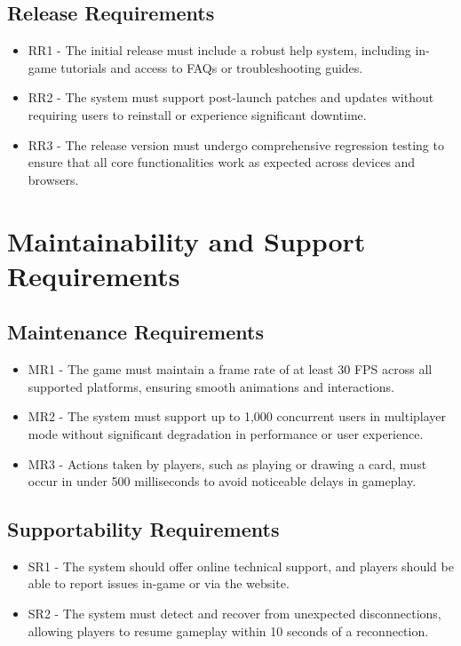 \documentclass{article}
\begin{document}
\subsection{Release Requirements}
\begin{itemize}
    \item RR1 - The initial release must include a robust help system, including in-game tutorials and access to FAQs or troubleshooting guides.
    \item RR2 - The system must support post-launch patches and updates without requiring users to reinstall or experience significant downtime.
    \item RR3 - The release version must undergo comprehensive regression testing to ensure that all core functionalities work as expected across devices and browsers.
\end{itemize}

\section{Maintainability and Support Requirements}

\subsection{Maintenance Requirements}
\begin{itemize}
    \item MR1 - The game must maintain a frame rate of at least 30 FPS across all supported platforms, ensuring smooth animations and interactions.
    \item MR2 - The system must support up to 1,000 concurrent users in multiplayer mode without significant degradation in performance or user experience.
    \item MR3 - Actions taken by players, such as playing or drawing a card, must occur in under 500 milliseconds to avoid noticeable delays in gameplay.
\end{itemize}

\subsection{Supportability Requirements}
\begin{itemize}
    \item SR1 - The system should offer online technical support, and players should be able to report issues in-game or via the website.
    \item SR2 - The system must detect and recover from unexpected disconnections, allowing players to resume gameplay within 10 seconds of a reconnection.
\end{itemize}
\end{document}
